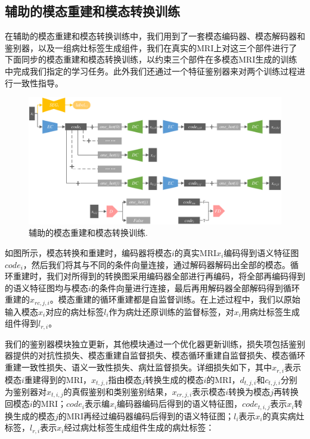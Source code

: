 \documentclass[letterpaper]{article} %
\begin{document}
\subsection{辅助的模态重建和模态转换训练}

在辅助的模态重建和模态转换训练中，我们用到了一套模态编码器、模态解码器和鉴别器，以及一组病灶标签生成组件，我们在真实的MRI上对这三个部件进行了下面同步的模态重建和模态转换训练，以约束三个部件在多模态MRI生成的训练中完成我们指定的学习任务。此外我们还通过一个特征鉴别器来对两个训练过程进行一致性指导。

\begin{figure}
	\centering
	\includegraphics[width=0.98\linewidth]{figures/trans_train}
	\caption{辅助的模态重建和模态转换训练.}
	\label{trans_train}
\end{figure}

如图所示，模态转换和重建时，编码器将模态$i$的真实MRI$x_i$编码得到语义特征图$code_{i}$，然后我们将其与不同的条件向量连接，通过解码器解码出全部的模态。循环重建时，我们对所得到的转换图采用编码器全部进行再编码，将全部再编码得到的语义特征图均与模态$i$的条件向量进行连接，最后再用解码器全部解码得到循环重建的$x_{rc,j,i}$。模态重建的循环重建都是自监督训练。在上述过程中，我们以原始输入模态$x_i$对应的病灶标签$l_i$作为病灶还原训练的监督标签，对$x_i$用病灶标签生成组件得到$l_{r,i}$。

我们的鉴别器模块独立更新，其他模块通过一个优化器更新训练，损失项包括鉴别器提供的对抗性损失、模态重建自监督损失、模态循环重建自监督损失、模态循环重建一致性损失、语义一致性损失、病灶监督损失。详细损失如下，其中$x_{r,i}$表示模态$i$重建得到的MRI，$x_{t,j,i}$指由模态$j$转换生成的模态$i$的MRI，$d_{t,j,i}$和$c_{t,j,i}$分别为鉴别器对$x_{t,i,j}$的真假鉴别和类别鉴别结果，$x_{cr,j,i}$表示模态$i$转换为模态$j$再转换回模态$i$的MRI；$code_i$表示编$x_i$编码器编码后得到的语义特征图，$code_{t,i,j}$表示$x_i$转换生成的模态$j$的MRI再经过编码器编码后得到的语义特征图；$l_i$表示$x_i$的真实病灶标签，$l_{r,i}$表示$x_i$经过病灶标签生成组件生成的病灶标签：
\end{document}
